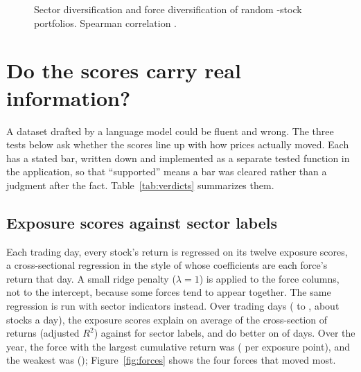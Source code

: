 \documentclass[11pt]{article}
\begin{document}
\begin{figure}[t]
\centering
{}
\caption{Sector diversification and force diversification of \nRandom{} random \randomSize-stock portfolios. Spearman correlation \spearmanSectorsForces.}\label{fig:scatter}
\end{figure}

\section{Do the scores carry real information?}\label{sec:tests}

A dataset drafted by a language model could be fluent and wrong. The three tests below ask whether the scores line up with how prices actually moved. Each has a stated bar, written down and implemented as a separate tested function in the application, so that ``supported'' means a bar was cleared rather than a judgment after the fact. Table~\ref{tab:verdicts} summarizes them.

\subsection{Exposure scores against sector labels}

Each trading day, every stock's return is regressed on its twelve exposure scores, a cross-sectional regression in the style of \citet{famamacbeth1973} whose coefficients are each force's return that day. A small ridge penalty ($\lambda = 1$) is applied to the force columns, not to the intercept, because some forces tend to appear together. The same regression is run with sector indicators instead. Over \fitDays{} trading days (\fitFrom{} to \fitTo, about \fitStocks{} stocks a day), the exposure scores explain on average \fitExposures{} of the cross-section of returns (adjusted $R^2$) against \fitSectors{} for sector labels, and do better on \fitDaysBetter{} of days. Over the year, the force with the largest cumulative return was \bestForce{} (\bestForceCum{} per exposure point), and the weakest was \worstForce{} (\worstForceCum); Figure~\ref{fig:forces} shows the four forces that moved most.
\end{document}
